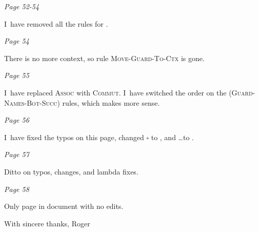 \documentclass[manuscript,screen, 12pt, nonacm]{acmart}
\begin{document}
\it{Page 52-54}

I~have removed all the rules for \PPlus. 

\it{Page 54}

There is no more context, so rule \textsc{Move-Guard-To-Ctx} is gone. 

\it{Page 55}

I~have replaced \textsc{Assoc} with \textsc{Commut}. I~have switched the order
on the \textsc{(Guard-Names-Bot-Succ)} rules, which makes more sense. 

\it{Page 56}

I~have fixed the typos on this page, changed $\square$ to \dbar, and \dots to
\Gs. 

\it{Page 57}

Ditto on typos, changes, and lambda fixes. 

\it{Page 58}

Only page in document with no edits. 


With sincere thanks, 
Roger
\end{document}

